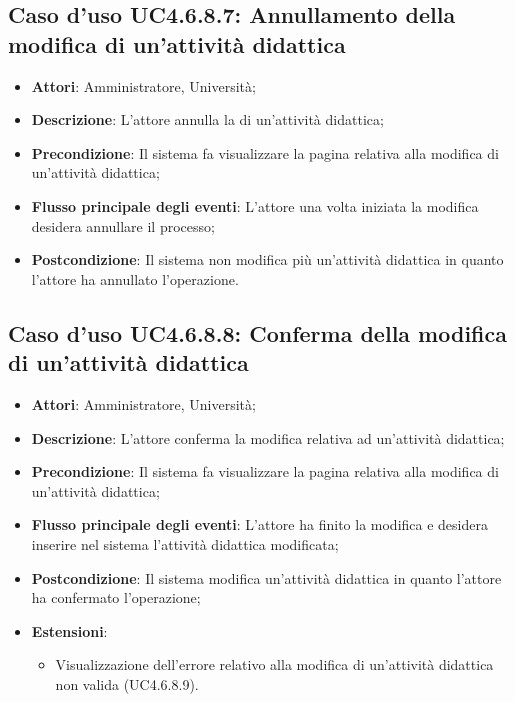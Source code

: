 \subsection{Caso d'uso \texorpdfstring{UC4.6.8.7}{UC4.6.8.7}: Annullamento della modifica di un'attività didattica}
\begin{itemize}
	\item \textbf{Attori}: Amministratore, Università;
	\item \textbf{Descrizione}: L'attore annulla la di un'attività didattica;
	
	\item \textbf{Precondizione}: Il sistema fa visualizzare la pagina relativa alla modifica di un'attività didattica;
	
	\item \textbf{Flusso principale degli eventi}: L'attore una volta iniziata la modifica desidera annullare il processo;
	
	\item \textbf{Postcondizione}: Il sistema non modifica più un'attività didattica in quanto l'attore ha annullato l'operazione.
	
\end{itemize}
\subsection{Caso d'uso \texorpdfstring{UC4.6.8.8}{UC4.6.8.8}: Conferma della modifica di un'attività didattica}
\begin{itemize}
	\item \textbf{Attori}: Amministratore, Università;
	\item \textbf{Descrizione}: L'attore conferma la modifica relativa ad un'attività didattica;
	
	\item \textbf{Precondizione}: Il sistema fa visualizzare la pagina relativa alla modifica di un'attività didattica;
	
	
	\item \textbf{Flusso principale degli eventi}: L'attore ha finito la modifica e desidera inserire nel sistema l'attività didattica modificata;
	
	\item \textbf{Postcondizione}: Il sistema modifica un'attività didattica in quanto l'attore ha confermato l'operazione;
	
	
	\item \textbf{Estensioni}:
	\begin{itemize}
		\item Visualizzazione dell'errore relativo alla modifica di un’attività didattica non valida (UC4.6.8.9).
	\end{itemize}
\end{itemize}

